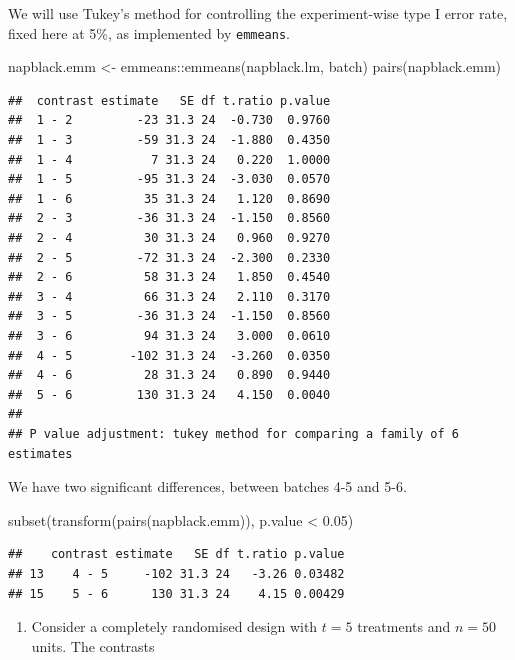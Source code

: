 \documentclass[
]{book}
\newenvironment{Shaded}{\begin{snugshade}}{\end{snugshade}}
\newcommand{\FloatTok}[1]{\textcolor[rgb]{0.00,0.00,0.81}{#1}}
\newcommand{\FunctionTok}[1]{\textcolor[rgb]{0.00,0.00,0.00}{#1}}
\newcommand{\NormalTok}[1]{#1}
\newcommand{\OtherTok}[1]{\textcolor[rgb]{0.56,0.35,0.01}{#1}}
\newcommand{\SpecialCharTok}[1]{\textcolor[rgb]{0.00,0.00,0.00}{#1}}
\newcommand{\StringTok}[1]{\textcolor[rgb]{0.31,0.60,0.02}{#1}}
\providecommand{\tightlist}{%
  \setlength{\itemsep}{0pt}\setlength{\parskip}{0pt}}
\theoremstyle{definition}
\theoremstyle{definition}
\theoremstyle{definition}
\theoremstyle{definition}
\theoremstyle{remark}
\begin{document}
\begin{enumerate}
  We will use Tukey's method for controlling the experiment-wise type I error rate, fixed here at 5\%, as implemented by \texttt{emmeans}.

\begin{Shaded}
\begin{Highlighting}[]
\NormalTok{napblack.emm }\OtherTok{\textless{}{-}}\NormalTok{ emmeans}\SpecialCharTok{::}\FunctionTok{emmeans}\NormalTok{(napblack.lm, }\StringTok{\textquotesingle{}batch\textquotesingle{}}\NormalTok{)}
\FunctionTok{pairs}\NormalTok{(napblack.emm)}
\end{Highlighting}
\end{Shaded}

\begin{verbatim}
##  contrast estimate   SE df t.ratio p.value
##  1 - 2         -23 31.3 24  -0.730  0.9760
##  1 - 3         -59 31.3 24  -1.880  0.4350
##  1 - 4           7 31.3 24   0.220  1.0000
##  1 - 5         -95 31.3 24  -3.030  0.0570
##  1 - 6          35 31.3 24   1.120  0.8690
##  2 - 3         -36 31.3 24  -1.150  0.8560
##  2 - 4          30 31.3 24   0.960  0.9270
##  2 - 5         -72 31.3 24  -2.300  0.2330
##  2 - 6          58 31.3 24   1.850  0.4540
##  3 - 4          66 31.3 24   2.110  0.3170
##  3 - 5         -36 31.3 24  -1.150  0.8560
##  3 - 6          94 31.3 24   3.000  0.0610
##  4 - 5        -102 31.3 24  -3.260  0.0350
##  4 - 6          28 31.3 24   0.890  0.9440
##  5 - 6         130 31.3 24   4.150  0.0040
## 
## P value adjustment: tukey method for comparing a family of 6 estimates
\end{verbatim}

  We have two significant differences, between batches 4-5 and 5-6.

\begin{Shaded}
\begin{Highlighting}[]
\FunctionTok{subset}\NormalTok{(}\FunctionTok{transform}\NormalTok{(}\FunctionTok{pairs}\NormalTok{(napblack.emm)), p.value }\SpecialCharTok{\textless{}} \FloatTok{0.05}\NormalTok{)}
\end{Highlighting}
\end{Shaded}

\begin{verbatim}
##    contrast estimate   SE df t.ratio p.value
## 13    4 - 5     -102 31.3 24   -3.26 0.03482
## 15    5 - 6      130 31.3 24    4.15 0.00429
\end{verbatim}
\end{enumerate}

\begin{enumerate}
\def\labelenumi{\arabic{enumi}.}
\setcounter{enumi}{3}
\tightlist
\item
  \citep[Adapted from][]{Morris2011} Consider a completely randomised design with \(t = 5\) treatments and \(n=50\) units. The contrasts
\end{enumerate}
\end{document}
